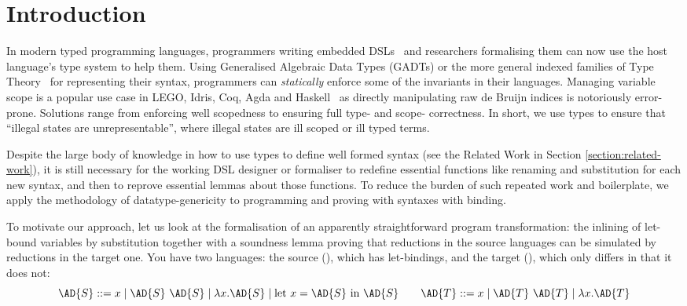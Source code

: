 
\newcommand{\semrec}{\AR{Semantics}}
\newcommand{\semfun}{\AF{semantics}}

\section{Introduction}

In modern typed programming languages, programmers writing embedded
DSLs~\cite{hudak1996building} and researchers formalising them can now
use the host language's type system to help them. Using Generalised
Algebraic Data Types (GADTs) or the more general indexed families of
Type Theory~\cite{dybjer1994inductive} for representing their syntax,
programmers can \emph{statically} enforce some of the invariants in
their languages. Managing variable scope is a popular use
case in LEGO, Idris, Coq, Agda and Haskell~\cite{altenkirch1999monadic,DBLP:conf/gpce/BradyH06,DBLP:journals/jar/HirschowitzM12,BachPoulsen,plfa2018,eisenbergsticth18}
 as directly manipulating raw de
Bruijn indices is notoriously error-prone. Solutions range from enforcing
well scopedness to ensuring full type- and scope- correctness. In short,
we use types to ensure that ``illegal states are unrepresentable'', where
illegal states are ill scoped or ill typed terms.

Despite the large body of knowledge in how to use types to define well
formed syntax (see the Related Work in Section
\ref{section:related-work}), it is still necessary for the working DSL
designer or formaliser to redefine essential functions like renaming
and substitution for each new syntax, and then to reprove essential
lemmas about those functions. To reduce the burden of such repeated
work and boilerplate, we apply the methodology of datatype-genericity to
programming and proving with syntaxes with binding.

To motivate our approach, let us look at the formalisation of an
apparently straightforward program transformation: the inlining of
let-bound variables by substitution together with a soundness lemma
proving that reductions in the source languages can be simulated by
reductions in the target one. You have two languages: the source
(), which has let-bindings, and the target (), which only
differs in that it does not:
\begin{displaymath}
  \AD{S} ::= x \mid \AD{S}~\AD{S} \mid \lambda x. \AD{S} \mid \textrm{let }x=\AD{S}\textrm{ in }\AD{S}
  \qquad
  \AD{T} ::= x \mid \AD{T}~\AD{T} \mid \lambda x. \AD{T}
\end{displaymath}


